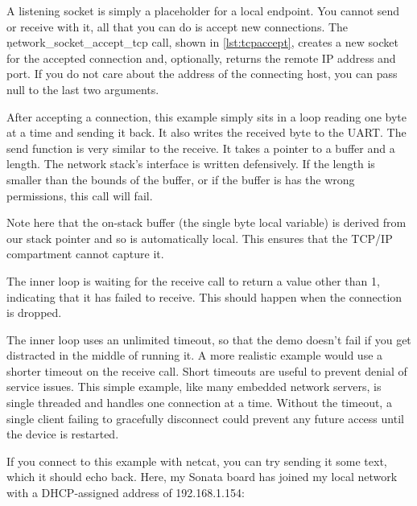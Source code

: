 \codelisting[filename=examples/tcp_echo_server/tcp.cc,marker=listen,label=lst:tcplisten,caption="Listening for TCP connections to a local port."]{}

A listening socket is simply a placeholder for a local endpoint.
You cannot send or receive with it, all that you can do is accept new connections.
The \c{network_socket_accept_tcp} call, shown in \ref{lst:tcpaccept}, creates a new socket for the accepted connection and, optionally, returns the remote IP address and port.
If you do not care about the address of the connecting host, you can pass null to the last two arguments.

\codelisting[filename=examples/tcp_echo_server/tcp.cc,marker=accept,label=lst:tcpaccept,caption="Accepting TCP connections and running a simple echo-server loop."]{}

After accepting a connection, this example simply sits in a loop reading one byte at a time and sending it back.
It also writes the received byte to the UART.
The send function is very similar to the receive.
It takes a pointer to a buffer and a length.
The network stack's interface is written defensively.
If the length is smaller than the bounds of the buffer, or if the buffer is has the wrong permissions, this call will fail.


Note here that the on-stack buffer (the single byte local variable) is derived from our stack pointer and so is automatically local.
This ensures that the TCP/IP compartment cannot capture it.

The inner loop is waiting for the receive call to return a value other than 1, indicating that it has failed to receive.
This should happen when the connection is dropped.

The inner loop uses an unlimited timeout, so that the demo doesn't fail if you get distracted in the middle of running it.
A more realistic example would use a shorter timeout on the receive call.
Short timeouts are useful to prevent denial of service issues.
This simple example, like many embedded network servers, is single threaded and handles one connection at a time.
Without the timeout, a single client failing to gracefully disconnect could prevent any future access until the device is restarted.

If you connect to this example with netcat, you can try sending it some text, which it should echo back.
Here, my Sonata board has joined my local network with a DHCP-assigned address of 192.168.1.154:

